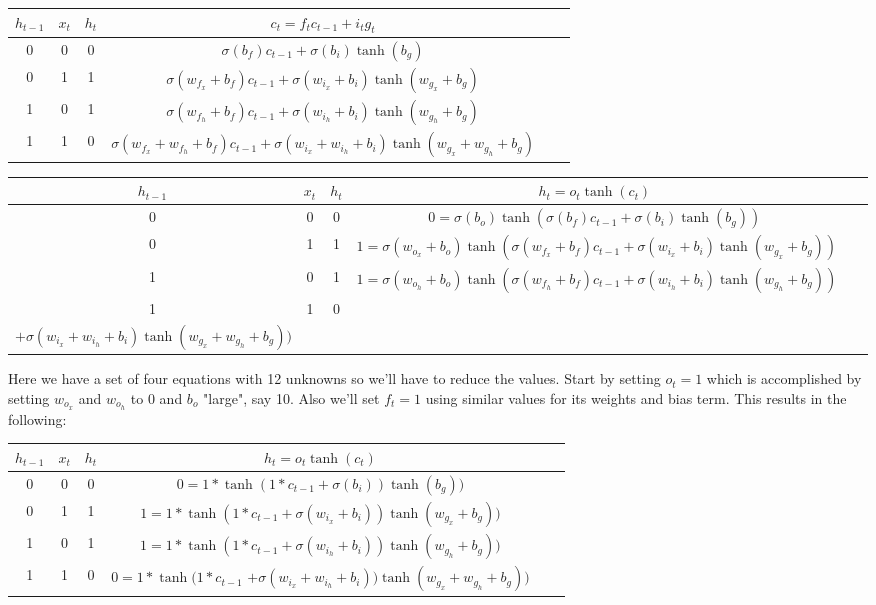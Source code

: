 \documentclass{article}
\begin{document}
\begin{center}\begin{tabular}{ |c|c|c|c|c|c| } 
\hline
$h_{t-1}$ & $x_t$ & $h_t$ & $c_t= f_t c_{t-1} + i_t g_t$ \\
\hline
0 & 0 & 0 & $\sigma(b_f)c_{t-1} + \sigma(b_i)\tanh(b_g)$ \\ 
0 & 1 & 1 & $\sigma(w_{f_x}+b_f)c_{t-1} + \sigma(w_{i_x}+b_i)\tanh(w_{g_x}+b_g)$ \\ 
1 & 0 & 1 & $\sigma(w_{f_h}+b_f)c_{t-1} + \sigma(w_{i_h}+b_i)\tanh(w_{g_h}+b_g)$\\ 
1 & 1 & 0 & $\sigma(w_{f_x}+w_{f_h}+b_f)c_{t-1} + \sigma(w_{i_x}+w_{i_h}+b_i)\tanh(w_{g_x} + w_{g_h}+b_g)$ \\ 
\hline
\end{tabular}\end{center}

\begin{center}\begin{tabular}{ |c|c|c|c|c|c| } 
\hline
$h_{t-1}$ & $x_t$ & $h_t$ & $h_t = o_t\tanh(c_t)$ \\
\hline
0 & 0 & 0 & $0=\sigma(b_o)\tanh(\sigma(b_f)c_{t-1} + \sigma(b_i)\tanh(b_g))$ \\ 
0 & 1 & 1 & $1=\sigma(w_{o_x}+b_o)\tanh(\sigma(w_{f_x}+b_f)c_{t-1} + \sigma(w_{i_x}+b_i)\tanh(w_{g_x}+b_g))$ \\ 
1 & 0 & 1 & $1=\sigma(w_{o_h}+b_o)\tanh(\sigma(w_{f_h}+b_f)c_{t-1} + \sigma(w_{i_h}+b_i)\tanh(w_{g_h}+b_g))$\\ 
1 & 1 & 0 & \shortstack { $0=\sigma(w_{o_x}+w_{o_h}+b_o)\tanh(\sigma(w_{f_x}+w_{f_h}+b_f)c_{t-1}$ \\ $ + \sigma(w_{i_x}+w_{i_h}+b_i)\tanh(w_{g_x} + w_{g_h}+b_g))$} \\ 
\hline
\end{tabular}\end{center}

Here we have a set of four equations with 12 unknowns so we'll have to reduce the values. Start by setting $o_t=1$  which is accomplished by setting $w_{o_x}$ and $w_{o_h}$ to 0 and $b_o$ "large", say 10. Also we'll set $f_t=1$ using similar values for its weights and bias term. This results in the following:

\begin{center}\begin{tabular}{ |c|c|c|c|c|c| } 
\hline
$h_{t-1}$ & $x_t$ & $h_t$ & $h_t = o_t\tanh(c_t)$ \\
\hline
0 & 0 & 0 & $0=1*\tanh(1*c_{t-1} + \sigma(b_i))\tanh(b_g))$ \\ 
0 & 1 & 1 & $1=1*\tanh(1*c_{t-1} + \sigma(w_{i_x}+b_i))\tanh(w_{g_x}+b_g))$ \\ 
1 & 0 & 1 & $1=1*\tanh(1*c_{t-1} + \sigma(w_{i_h}+b_i))\tanh(w_{g_h}+b_g))$\\ 
1 & 1 & 0 &  $0=1*\tanh(1*c_{t-1}$  $ + \sigma(w_{i_x}+w_{i_h}+b_i))\tanh(w_{g_x} + w_{g_h}+b_g))$ \\ 
\hline
\end{tabular}\end{center}
\end{document}
